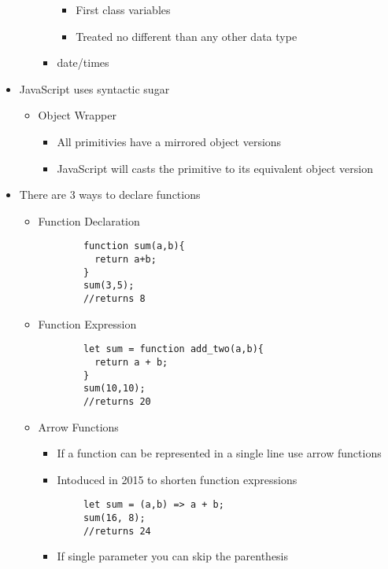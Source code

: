 \documentclass{article}
\begin{document}
\begin{itemize}
\begin{itemize}
\begin{itemize}
        \begin{itemize}
          \item First class variables
          \item Treated no different than any other data type
        \end{itemize}
        \item date/times
      \end{itemize}
    \end{itemize}
    \item JavaScript uses syntactic sugar
    \begin{itemize}
      \item Object Wrapper
      \begin{itemize}
        \item All primitivies have a mirrored object versions
        \item JavaScript will casts the primitive to its equivalent object version
      \end{itemize}
    \end{itemize}
    \item There are 3 ways to declare functions
    \begin{itemize}
      \item Function Declaration
      \begin{lstlisting}
        function sum(a,b){
          return a+b;
        }
        sum(3,5);
        //returns 8
      \end{lstlisting}
      \item Function Expression
      \begin{lstlisting}
        let sum = function add_two(a,b){
          return a + b;
        }
        sum(10,10);
        //returns 20
      \end{lstlisting}
      \item Arrow Functions
      \begin{itemize}
        \item If a function can be represented in a single line use arrow functions
        \item Intoduced in 2015 to shorten function expressions
      \end{itemize}
      \begin{lstlisting}
        let sum = (a,b) => a + b;
        sum(16, 8);
        //returns 24
      \end{lstlisting}
      \begin{itemize}
        \item If single parameter you can skip the parenthesis

\end{itemize}
\end{itemize}
\end{itemize}
\end{document}
